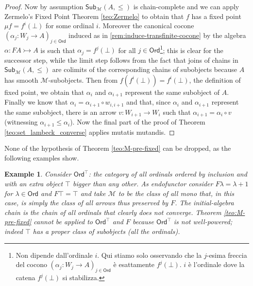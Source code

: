 \documentclass[letterpaper, 11pt, oneside]{memoir}
\theoremstyle{myteo}
\newtheorem{example}[theorem]{Example}
\numberwithin{equation}{section}
\newcommand{\Ord}{\textsf{Ord}}
\newcommand{\Sub}{\textsf{Sub}}
\begin{document}
\begin{proof}
  Now by assumption \(\Sub_{\mathcal{M}}(A, \leq)\) is chain-complete and we can apply Zermelo's Fixed Point Theorem \ref{teo:Zermelo} to obtain that \(f\) has a fixed point \(\mu f = f^i(\bot)\) for some ordinal \(i\).
  Moreover the canonical cocone \((\alpha_j : W_j \to A)_{j\in\Ord}\) induced as in \ref{rem:induce-transfinite-cocone} by the algebra \(\alpha : FA \rightarrowtail A\) is such that \(\alpha_j = f^j(\bot)\) for all \(j \in \Ord\)\footnote{\color{teal} Non dipende dall'ordinale \(i\). Qui stiamo solo osservando che la \(j\)-esima freccia del cocono \((\alpha_j : W_j \to A)_{j \in \Ord}\) è esattamente \(f^j(\bot)\). \(i\) è l'ordinale dove la catena \(f^j(\bot)\) si stabilizza.}; this is clear for the successor step, while the limit step follows from the fact that joins of chains in \(\Sub_\mathcal{M}(A, \leq)\) are colimits of the corresponding chains of subobjects because \(A\) has smooth \(\mathcal{M}\)-subobjects.
  Then from \(f(f^i(\bot)) = f^i(\bot)\), the definition of fixed point, we obtain that \(\alpha_i\) and \(\alpha_{i+1}\) represent the same subobject of \(A\).
  Finally we know that \(\alpha_i = \alpha_{i+1} \circ w_{i, i+1}\) and that, since \(\alpha_i\) and \(\alpha_{i+1}\) represent the same subobject, there is an arrow \(v : W_{i+1} \to W_i\) such that \(\alpha_{i+1} = \alpha_i \circ v\) (witnessing \(\alpha_{i+1} \leq \alpha_i\)).
  Now the final part of the proof of Theorem \ref{teo:set_lambeck_converse} applies mutatis mutandis.
\end{proof}

None of the hypothesis of Theorem \ref{teo:M-pre-fixed} can be dropped, as the following examples show.

\begin{example}
  Consider \(\Ord^\top\): the category of all ordinals ordered by inclusion and with an extra object \(\top\) bigger than any other.
  As endofunctor consider \(F\lambda = \lambda+1\) for \(\lambda \in \Ord\) and \(F\top = \top\) and take \(\mathcal{M}\) to be the class of all mono that, in this case, is simply the class of all arrows thus preserved by \(F\).
  The initial-algebra chain is the chain of all ordinals that clearly does not converge.
  Theorem \ref{teo:M-pre-fixed} cannot be applied to \(\Ord^\top\) and \(F\) because \(\Ord^\top\) is not well-powered; indeed \(\top\) has a proper class of subobjects (all the ordinals).
\end{example}
\end{document}
